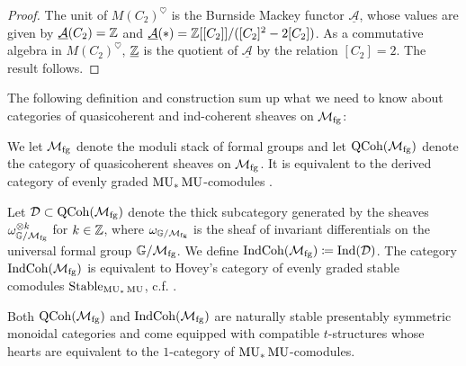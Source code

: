 \begin{proof}
  The unit of $M(C_2)^{\heartsuit}$ is the Burnside Mackey functor $\underline{\mathcal{A}}$, whose values are given by $\underline{\mathcal{A}} (C_2) = \mathbb{Z}$ and $\underline{\mathcal{A}} (\ast) = \mathbb{Z}[[C_2]]/([C_2]^2 - 2[C_2])$.
  As a commutative algebra in $M(C_2)^{\heartsuit}$, $\underline{\mathbb{Z}}$ is the quotient of $\underline{\mathcal{A}}$ by the relation $[C_2]=2$.
  The result follows.
\end{proof}

The following definition and construction sum up what we need to know about categories of quasicoherent and ind-coherent sheaves on $\mathcal{M}_{\mathrm{fg}}$:

\begin{dfn} \label{dfn:IndCoh}
  We let $\mathcal{M}_{\mathrm{fg}}$ denote the moduli stack of formal groups and let $\mathrm{QCoh} (\mathcal{M}_{\mathrm{fg}})$ denote the category of quasicoherent sheaves on $\mathcal{M}_{\mathrm{fg}}$.
  It is equivalent to the derived category of evenly graded $\operatorname{\mathrm{MU}}_* \operatorname{\mathrm{MU}}$-comodules \cite[Remarks 2.38 and 3.14]{GoerssMfg}.
%

  Let $\mathcal{D} \subset \mathrm{QCoh}(\mathcal{M}_{\mathrm{fg}})$ denote the thick subcategory generated by the sheaves $\omega_{\mathbb{G}/\mathcal{M}_{\mathrm{fg}}} ^{\otimes k}$ for $k \in \mathbb{Z}$, where $\omega_{\mathbb{G} / \mathcal{M}_{\mathrm{fg}}}$ is the sheaf of invariant differentials on the universal formal group $\mathbb{G} / \mathcal{M}_{\mathrm{fg}}$. We define $\mathrm{IndCoh}(\mathcal{M}_{\mathrm{fg}}) \coloneqq \mathrm{Ind}(\mathcal{D})$.
  The category $\mathrm{IndCoh}(\mathcal{M}_{\mathrm{fg}})$ is equivalent to Hovey's category of evenly graded stable comodules $\mathrm{Stable}_{\operatorname{\mathrm{MU}}_* \operatorname{\mathrm{MU}}}$, c.f. \cite[Remark 4.30]{LocDual}.

  Both $\mathrm{QCoh}(\mathcal{M}_{\mathrm{fg}})$ and $\mathrm{IndCoh}(\mathcal{M}_{\mathrm{fg}})$ are naturally stable presentably symmetric monoidal categories and come equipped with compatible $t$-structures whose hearts are equivalent to the $1$-category of $\operatorname{\mathrm{MU}}_* \operatorname{\mathrm{MU}}$-comodules. 
\end{dfn}

